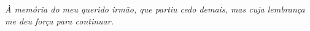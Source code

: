 \vspace*{\fill}
\begin{flushright}
    \textit{À memória do meu querido irmão, que partiu cedo demais, mas cuja lembrança me deu força para continuar.}
\end{flushright}
\vspace*{\fill}